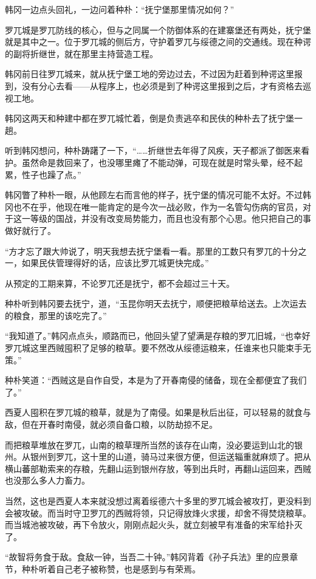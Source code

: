 韩冈一边点头回礼，一边问着种朴：“抚宁堡那里情况如何？”

罗兀城是罗兀防线的核心，但与之同属一个防御体系的在建寨堡还有两处，抚宁堡就是其中之一。位于罗兀城的侧后方，守护着罗兀与绥德之间的交通线。现在种谔的副将折继世，就在那里主持营造工程。

韩冈前日往罗兀城来，就从抚宁堡工地的旁边过去，不过因为赶着到种谔这里报到，没有分心去看——从程序上，也必须是到了种谔这里报到之后，才有资格去巡视工地。

韩冈这两天和种建中都在罗兀城忙着，倒是负责逃卒和民伕的种朴去了抚宁堡一趟。

听到韩冈想问，种朴踌躇了一下，“……折继世去年得了风疾，天子都派了御医来看护。虽然命是救回来了，也没哪里瘫了不能动弹，可现在就是时常头晕，经不起累，性子也躁了点。”

韩冈瞥了种朴一眼，从他顾左右而言他的样子，抚宁堡的情况可能不太好。不过韩冈也不在乎，他现在唯一能肯定的是今次一战必败，作为一名管勾伤病的官员，对于这一等级的国战，并没有改变局势能力，而且也没有那个心思。他只把自己的事做好就行了。

“方才忘了跟大帅说了，明天我想去抚宁堡看一看。那里的工数只有罗兀的十分之一，如果民伕管理得好的话，应该比罗兀城更快完成。”

从预定的工期来算，不论罗兀还是抚宁，都不会超过三十天。

种朴听到韩冈要去抚宁，道，“玉昆你明天去抚宁，顺便把粮草给送去。上次运去的粮食，那里的该吃完了。”

“我知道了。”韩冈点点头，顺路而已，他回头望了望满是存粮的罗兀旧城，“也幸好罗兀城这里西贼囤积了足够的粮草。要不然改从绥德运粮来，任谁来也只能束手无策。”

种朴笑道：“西贼这是自作自受，本是为了开春南侵的储备，现在全都便宜了我们了。”

西夏人囤积在罗兀城的粮草，就是为了南侵。如果是秋后出征，可以轻易的就食与敌，但在开春时南侵，就必须自备口粮，以防劫掠不足。

而把粮草堆放在罗兀，山南的粮草理所当然的该存在山南，没必要运到山北的银州。从银州到罗兀，这十里的山道，骑马过来很方便，但运送辎重就麻烦了。把从横山蕃部勒索来的存粮，先翻山运到银州存放，等到出兵时，再翻山运回来，西贼也没那么多人力畜力。

当然，这也是西夏人本来就没想过离着绥德六十多里的罗兀城会被攻打，更没料到会被攻破。而当时守卫罗兀的西贼将领，只记得放烽火求援，却舍不得焚烧粮草。而当城池被攻破，再下令放火，刚刚点起火头，就立刻被早有准备的宋军给扑灭了。

“故智将务食于敌。食敌一钟，当吾二十钟。”韩冈背着《孙子兵法》里的应景章节，种朴听着自己老子被称赞，也是感到与有荣焉。

